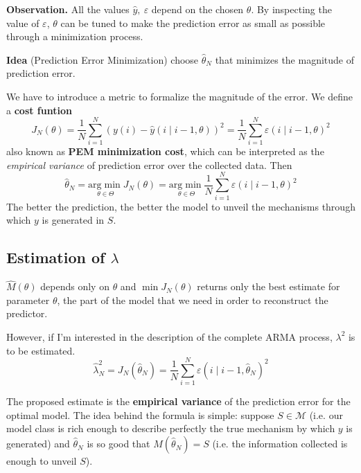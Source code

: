 \textbf{Observation.}
All the values $ \hat{y} ,\ \varepsilon $ depend on the chosen $ \theta $. By inspecting the value of $ \varepsilon $, $ \theta $ can be tuned to make the prediction error as small as possible through a minimization process.

\textbf{Idea} (Prediction Error Minimization)
choose $ \hat{\theta }_{N}$ that minimizes the magnitude of prediction error.

We have to introduce a metric to formalize the magnitude of the error. We define a \textbf{cost funtion} 
\begin{equation*}
J_{N}(\theta) =\frac{1}{N}\sum _{i=1}^{N}(y(i) -\hat{y}(i\mid i-1,\theta))^{2} =\frac{1}{N}\sum _{i=1}^{N} \varepsilon (i\mid i-1,\theta)^{2}
\end{equation*}
also known as \textbf{PEM minimization cost}, which can be interpreted as the \emph{empirical variance} of prediction error over the collected data. Then 
\begin{equation*}
\hat{\theta }_{N} =\underset{\theta \in \Theta}{\mathrm{arg}\min} J_{N}(\theta) =\underset{\theta \in \Theta}{\mathrm{arg}\min}\frac{1}{N}\sum _{i=1}^{N} \varepsilon (i\mid i-1,\theta)^{2}
\end{equation*}
The better the prediction, the better the model to unveil the mechanisms through which $y$ is generated in $S$. 

\subsection{Estimation of \texorpdfstring{$\lambda$}{lambda}}

$ \hat{M}(\theta)$ depends only on $ \theta $ and $ \min J_{N}(\theta)$ returns only the best estimate for  parameter $ \theta $, the part of the model that we need in order to reconstruct the predictor.

However, if I'm interested in the description of the complete ARMA process, $ \lambda ^{2}$ is to be estimated. 
\begin{equation*}
\hat{\lambda }_{N}^{2} =J_{N}(\hat{\theta }_{N}) =\frac{1}{N}\sum _{i=1}^{N} \varepsilon (i\mid i-1,\hat{\theta }_{N})^{2}
\end{equation*}

The proposed estimate is the \textbf{empirical variance} of the prediction error for the optimal model. The idea behind the formula is simple: suppose $ S\in \mathcal{M} $ (i.e. our model class is rich enough to describe perfectly the true mechanism by which $y$ is generated) and $\hat{\theta }_{N}$ is so good that $M(\hat{\theta }_{N}) =S$ (i.e. the information collected is enough to unveil $S$).

